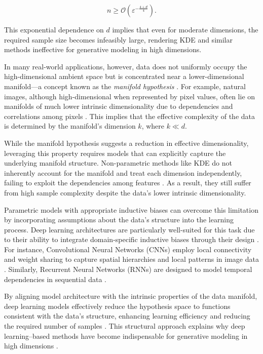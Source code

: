 \[
n \geq \mathcal{O}\left(\varepsilon^{-\frac{4 + d}{4}}\right).
\]

\noindent This exponential dependence on \( d \) implies that even for moderate dimensions, the required sample size becomes infeasibly large, rendering KDE and similar methods ineffective for generative modeling in high dimensions.

In many real-world applications, however, data does not uniformly occupy the high-dimensional ambient space but is concentrated near a lower-dimensional manifold—a concept known as the \emph{manifold hypothesis} \cite{fefferman2016testing}. For example, natural images, although high-dimensional when represented by pixel values, often lie on manifolds of much lower intrinsic dimensionality due to dependencies and correlations among pixels \cite{roweis2000nonlinear}. This implies that the effective complexity of the data is determined by the manifold's dimension \( k \), where \( k \ll d \).

While the manifold hypothesis suggests a reduction in effective dimensionality, leveraging this property requires models that can explicitly capture the underlying manifold structure. Non-parametric methods like KDE do not inherently account for the manifold and treat each dimension independently, failing to exploit the dependencies among features \cite{tenenbaum2000global}. As a result, they still suffer from high sample complexity despite the data's lower intrinsic dimensionality.

Parametric models with appropriate inductive biases can overcome this limitation by incorporating assumptions about the data's structure into the learning process. Deep learning architectures are particularly well-suited for this task due to their ability to integrate domain-specific inductive biases through their design \cite{lecun2015deep}. For instance, Convolutional Neural Networks (CNNs) employ local connectivity and weight sharing to capture spatial hierarchies and local patterns in image data \cite{lecun1998gradient}. Similarly, Recurrent Neural Networks (RNNs) are designed to model temporal dependencies in sequential data \cite{hochreiter1997long}.

By aligning model architecture with the intrinsic properties of the data manifold, deep learning models effectively reduce the hypothesis space to functions consistent with the data's structure, enhancing learning efficiency and reducing the required number of samples \cite{poggio2017theory}. This structural approach explains why deep learning–based methods have become indispensable for generative modeling in high dimensions \cite{goodfellow2016deep,kingma2013auto}.


